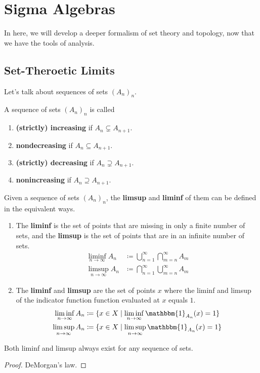 \section{Sigma Algebras} 

  In here, we will develop a deeper formalism of set theory and topology, now that we have the tools of analysis. 

\subsection{Set-Theroetic Limits}

  Let's talk about sequences of sets $(A_n)_n$. 

  \begin{definition}
    A sequence of sets $(A_n)_n$ is called 
    \begin{enumerate}
      \item \textbf{(strictly) increasing} if $A_n \subsetneq A_{n+1}$. 
      \item \textbf{nondecreasing} if $A_n \subseteq A_{n+1}$. 
      \item \textbf{(strictly) decreasing} if $A_n \supsetneq A_{n+1}$. 
      \item \textbf{nonincreasing} if $A_n \supseteq A_{n+1}$. 
    \end{enumerate}
  \end{definition}

  \begin{definition}
    Given a sequence of sets $(A_n)_n$, the \textbf{limsup} and \textbf{liminf} of them can be defined in the equivalent ways. 
    \begin{enumerate}
      \item The \textbf{liminf} is the set of points that are missing in only a finite number of sets, and the \textbf{limsup} is the set of points that are in an infinite number of sets. 
      \begin{align}
        \liminf_{n \to \infty} A_n & \coloneqq \bigcup_{n=1}^\infty \bigcap_{m=n}^\infty A_m \\
        \limsup_{n \to \infty} A_n & \coloneqq \bigcap_{n=1}^\infty \bigcup_{m=n}^\infty A_m 
      \end{align} 

      \item The \textbf{liminf} and \textbf{limsup} are the set of points $x$ where the liminf and limsup of the indicator function function evaluated at $x$ equals $1$. 
        \begin{align}
          \liminf_{n \to \infty} A_n & \coloneqq \{x \in X \mid \liminf_{n \to \infty} \mathbbm{1}_{A_n} (x) = 1 \} \\ 
          \limsup_{n \to \infty} A_n & \coloneqq \{x \in X \mid \limsup_{n \to \infty} \mathbbm{1}_{A_n} (x) = 1 \}
        \end{align}

    \end{enumerate}
    Both liminf and limsup always exist for any sequence of sets. 
  \end{definition} 
  \begin{proof}
    DeMorgan's law. 
  \end{proof}

